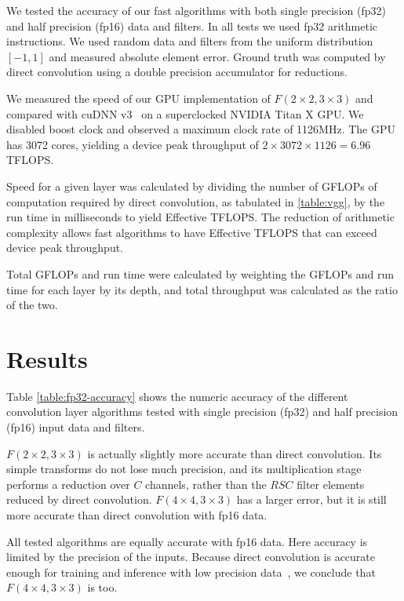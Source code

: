 \documentclass[10pt,twocolumn,letterpaper]{article}
\begin{document}
We tested the accuracy of our fast algorithms with both single precision (fp32) and half precision (fp16) data and filters. In all tests we used fp32 arithmetic instructions. We used random data and filters from the uniform distribution $\left[ -1,1 \right]$ and measured absolute element error. Ground truth was computed by direct convolution using a double precision accumulator for reductions.

We measured the speed of our GPU implementation of $F(2\times 2, 3\times 3)$ and compared with cuDNN v3~\cite{cuDNN} on a superclocked NVIDIA Titan X GPU. We disabled boost clock and observed a maximum clock rate of 1126MHz. The GPU has 3072 cores, yielding a device peak throughput of $2 \times 3072 \times 1126= 6.96$ TFLOPS.

Speed for a given layer was calculated by dividing the number of GFLOPs of computation required by direct convolution, as tabulated in \ref{table:vgg}, by the run time in milliseconds to yield Effective TFLOPS. The reduction of arithmetic complexity allows fast algorithms to have Effective TFLOPS that can exceed device peak throughput.

Total GFLOPs and run time were calculated by weighting the GFLOPs and run time for each layer by its depth, and total throughput was calculated as the ratio of the two.

\section{Results}

Table \ref{table:fp32-accuracy} shows the numeric accuracy of the different convolution layer algorithms tested with single precision (fp32) and half precision (fp16) input data and filters.

$F(2\times 2, 3 \times 3)$ is actually slightly more accurate than direct convolution. Its simple transforms do not lose much precision, and its multiplication stage performs a reduction over $C$ channels, rather than the $R S C$ filter elements reduced by direct convolution. $F(4\times 4, 3 \times 3)$ has a larger error, but it is still more accurate than direct convolution with fp16 data.

All tested algorithms are equally accurate with fp16 data. Here accuracy is limited by the precision of the inputs. Because direct convolution is  accurate enough for training and inference with low precision data~\cite{DBLP:journals/corr/CourbariauxBD14,gupta2015deep}, we conclude that $F(4\times 4, 3 \times 3)$ is too.
\end{document}
